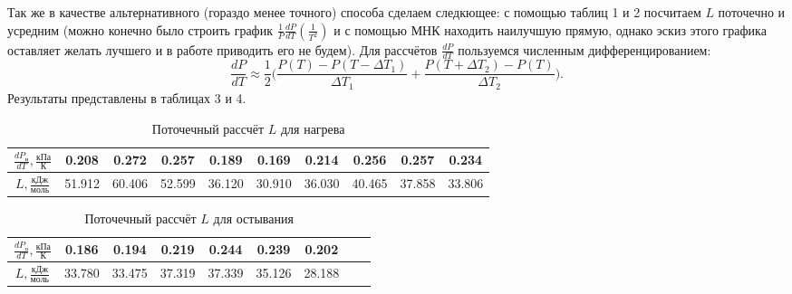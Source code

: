 \documentclass[a4paper,12pt]{article}
\begin{document}
\begin{enumerate}
 Так же в качестве альтернативного (гораздо менее точного) способа сделаем следкющее: с помощью таблиц 1 и 2 посчитаем $L$ поточечно и усредним (можно конечно было строить график $\frac{1}{P}\frac{dP}{dT}(\frac{1}{T^2})$ и с помощью МНК находить наилучшую прямую, однако эскиз этого графика оставляет желать лучшего и в работе приводить его не будем). Для рассчётов $\frac{dP}{dT}$ пользуемся численным дифференцированием: $$\frac{dP}{dT} \approx \frac{1}{2}\Big(\frac{P(T)- P(T- \Delta T_1)}{\Delta T_1} + \frac{P(T+\Delta T_2)- P(T)}{\Delta T_2}\Big). $$ Результаты представлены в таблицах 3 и 4. 


\begin{table}[h]	
\begin{tabular}{|c|c|c|c|c|c|c|c|c|c|}
	\hline 
	$\frac{dP_н}{dT}, {\frac{кПа}{К}}$  & 0.208 &0.272& 0.257& 0.189& 0.169& 0.214& 0.256&0.257 & 0.234  \\
	\hline 
	$L, {\frac{кДж}{моль}}$  & 51.912 & 60.406 & 52.599 & 36.120 & 30.910 & 36.030 & 40.465 & 37.858 & 33.806  \\
	\hline
\end{tabular}
\caption{Поточечный рассчёт $L$ для нагрева}
\end{table}

\begin{table}[h]
\begin{tabular}{|c|c|c|c|c|c|c|c|c|}
	\hline 
	$\frac{dP_о}{dT}, {\frac{кПа}{К}}$ &0.186 & 0.194& 0.219& 0.244 & 0.239 & 0.202  \\
	\hline
	$L, {\frac{кДж}{моль}}$  & 33.780 & 33.475 & 37.319 & 37.339 & 35.126 & 28.188 \\ 
	\hline
\end{tabular}
\caption{Поточечный рассчёт $L$ для остывания}
\end{table}


\end{enumerate}
\end{document}
